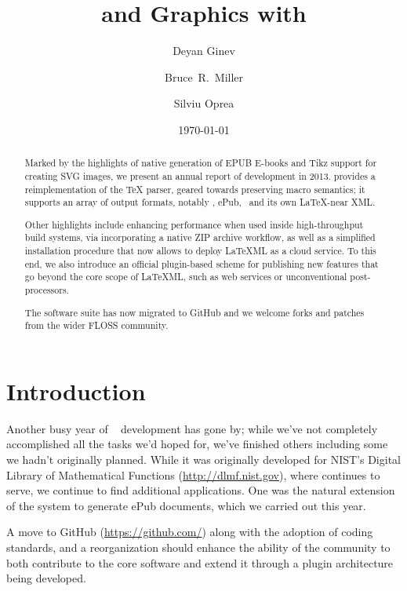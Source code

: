 \documentclass{llncs}
\title{\ebooks and Graphics with \LaTeXML}
\author{Deyan Ginev\inst{1} \and Bruce~R.~Miller\inst{2} \and Silviu Oprea\inst{3}}
\institute{Computer Science, Jacobs University Bremen, Germany
 \and National Institute of Standards and Technology, Gaithersburg, MD, USA
 \and University of Oxford, Oxford, UK.}
\date{\today}
\def\ebooks{\mbox{E-books}\xspace}
\begin{document}
\maketitle
\begin{abstract}
Marked by the highlights of native generation of EPUB \ebooks and Tikz support for creating SVG images, we present an annual report of {\LaTeXML} development in 2013. {\LaTeXML} provides a reimplementation of the TeX parser, geared towards preserving macro semantics; it supports an array of output formats, notably , ePub, \XHTML\ and its own \LaTeX-near XML. 

Other highlights include enhancing performance when used inside high-throughput build systems, via incorporating a native ZIP archive workflow, as well as a simplified installation procedure that now allows to deploy LaTeXML as a cloud service. To this end, we also introduce an official plugin-based scheme for publishing new features that go beyond the core scope of LaTeXML, such as web services or unconventional post-processors.

The software suite has now migrated to GitHub and we welcome forks and patches from the wider FLOSS community.
\end{abstract}

\section{Introduction}
Another busy year of \LaTeXML\ \cite{Miller:latexml:online} development has gone by;
while we've not completely accomplished all the tasks we'd hoped for,
we've finished others including some we hadn't originally planned.
While it was originally developed for NIST's Digital Library of Mathematical Functions (\url{http://dlmf.nist.gov}),
where continues to serve, we continue to find additional applications.
One was the natural extension of the system to generate ePub documents,
which we carried out this year. 

A move to GitHub (\url{https://github.com/}) along with
the adoption of coding standards, and a reorganization should enhance
the ability of the community to both contribute to the core software
and extend it through a plugin architecture being developed.
\end{document}
